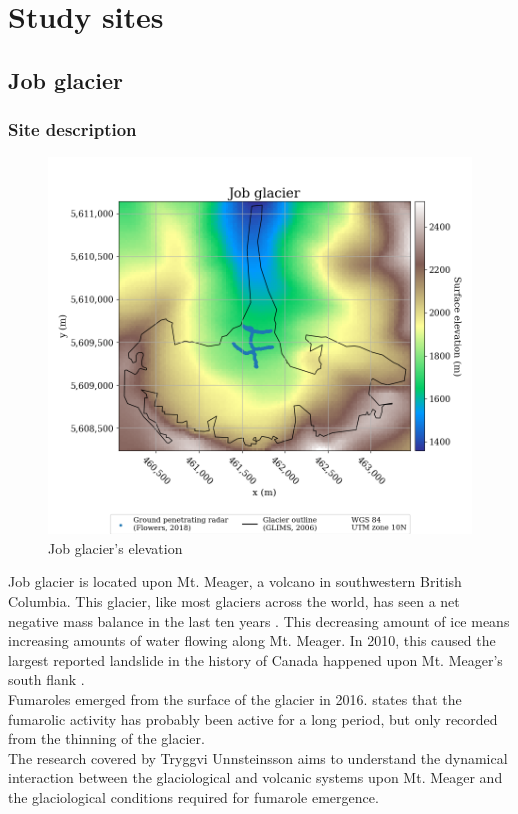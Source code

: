 \documentclass[a4, 12pt]{article}
\begin{document}
\section{Study sites}
\subsection{Job glacier}
\subsubsection{Site description}
\begin{figure}[h!]
\centering
\includegraphics[scale=0.5]{../job_kluane_maps/Job glacier_elevation.png}
\caption{Job glacier's elevation}
\label{fig:job_dem}
\end{figure}
Job glacier is located upon Mt. Meager, a volcano in southwestern British Columbia. This glacier, like most glaciers across the world, has seen a net negative mass balance in the last ten years \cite{reyes2004stratigraphic}. This decreasing amount of ice means increasing amounts of water flowing along Mt. Meager. In 2010, this caused the largest reported landslide in the history of Canada happened upon Mt. Meager's south flank \cite{roberti2018landslides}.\\
Fumaroles emerged from the surface of the glacier in 2016. \citeauthor{roberti2018landslides} \citeyear{roberti2018landslides} states that the fumarolic activity has probably been active for a long period, but only recorded from the thinning of the glacier.\\
The research covered by Tryggvi Unnsteinsson aims to understand the dynamical interaction between the glaciological and volcanic systems upon Mt. Meager and the glaciological conditions required for fumarole emergence.
\end{document}
